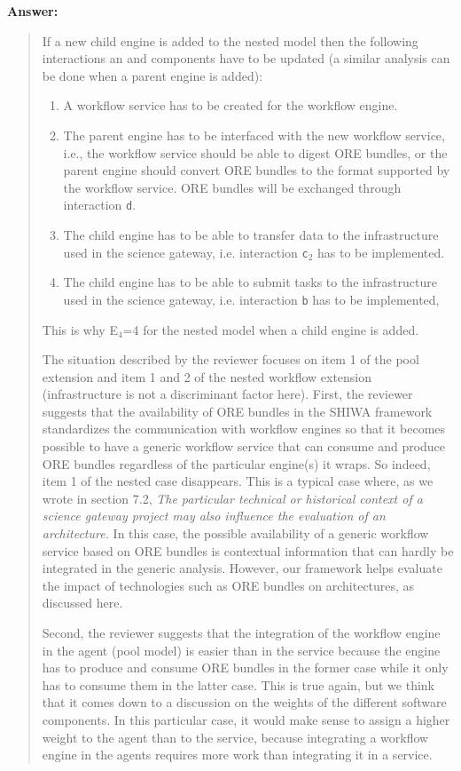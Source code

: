 \documentclass[a4]{article}
\newenvironment{answer}%
{\textbf{Answer:}\begin{small}\begin{quote}}%
{\end{quote}\end{small}}%
\newcommand{\revised}[1]{\color{blue} #1\color{black}\xspace}
\begin{document}
\begin{answer}
If a new child engine is added to the nested model then the following interactions an and components have to be updated (a similar analysis can be done when a parent engine is added):
\begin{enumerate}
\item A workflow service has to be created for the workflow engine.
\item The parent engine has to be interfaced with the new workflow
  service, i.e., the workflow service should be able to digest ORE
  bundles, or the parent engine should convert ORE bundles to the
  format supported by the workflow service. ORE bundles will be
  exchanged through interaction \texttt{d}.
 \item The child engine has to be able to transfer data to the
   infrastructure used in the science gateway, i.e. interaction
   \texttt{c$_2$} has to be implemented.
 \item The child engine has to be able to submit tasks to the infrastructure
   used in the science gateway, i.e. interaction \texttt{b} has to be
   implemented,
\end{enumerate}
This is why E$_4$=4 for the nested model when a child engine is added.

The situation described by the reviewer focuses on item 1 of the pool
extension and item 1 and 2 of the nested workflow extension
(infrastructure is not a discriminant factor here). First, the
reviewer suggests that the availability of ORE bundles in the SHIWA
framework standardizes the communication with workflow engines so that
it becomes possible to have a generic workflow service that can
consume and produce ORE bundles regardless of the particular engine(s)
it wraps. So indeed, item 1 of the nested case disappears. This is a
typical case where, as we wrote in section 7.2, \emph{The particular
technical or historical context of a science gateway project may also
influence the \revised{evaluation} of an architecture.} In this
case, the possible availability of a generic workflow service based on
ORE bundles is contextual information that can hardly be integrated in
the generic analysis. However, our framework helps evaluate
the impact of technologies such as ORE bundles on architectures, as
discussed here.

Second, the reviewer suggests that the integration of the workflow
engine in the agent (pool model) is easier than in the service because
the engine has to produce and consume ORE bundles in the former case
while it only has to consume them in the latter case. This is true
again, but we think that it comes down to a discussion on the weights
of the different software components. In this particular case, it
would make sense to assign a higher weight to the agent than to the
service, because integrating a workflow engine in the agents requires
more work than integrating it in a service.


\end{answer}
\end{document}
